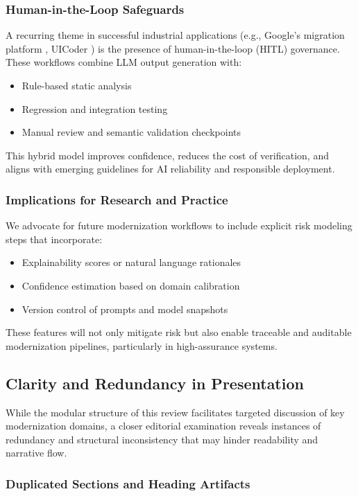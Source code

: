 \documentclass[12pt]{article}
\begin{document}
\subsubsection{Human-in-the-Loop Safeguards}

A recurring theme in successful industrial applications (e.g., Google’s migration platform \cite{googlemigrate2025}, UICoder \cite{wu2024uicoder}) is the presence of human-in-the-loop (HITL) governance. These workflows combine LLM output generation with:
\begin{itemize}
    \item Rule-based static analysis
    \item Regression and integration testing
    \item Manual review and semantic validation checkpoints
\end{itemize}
This hybrid model improves confidence, reduces the cost of verification, and aligns with emerging guidelines for AI reliability and responsible deployment.

\subsubsection{Implications for Research and Practice}

We advocate for future modernization workflows to include explicit risk modeling steps that incorporate:
\begin{itemize}
    \item Explainability scores or natural language rationales
    \item Confidence estimation based on domain calibration
    \item Version control of prompts and model snapshots
\end{itemize}
These features will not only mitigate risk but also enable traceable and auditable modernization pipelines, particularly in high-assurance systems.

\subsection{Clarity and Redundancy in Presentation}

While the modular structure of this review facilitates targeted discussion of key modernization domains, a closer editorial examination reveals instances of redundancy and structural inconsistency that may hinder readability and narrative flow.

\subsubsection{Duplicated Sections and Heading Artifacts}
\end{document}
